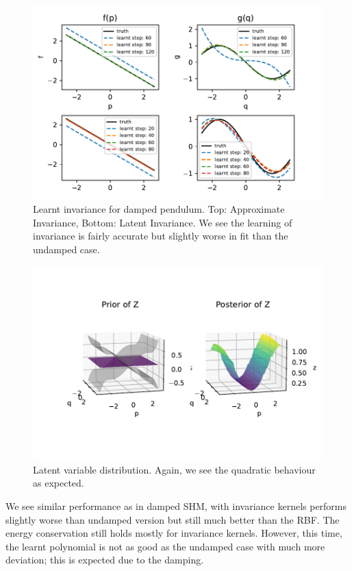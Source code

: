 \documentclass{statsmsc}
\begin{document}
\begin{figure}[H] 
  \includegraphics[width=0.8\linewidth]{../codes/figures/damped_pendulum_learnt_over_time.pdf}
  \centering
  \caption{Learnt invariance for damped pendulum. Top: Approximate Invariance, Bottom: Latent Invariance. We see the learning of invariance is fairly accurate but slightly worse in fit than the undamped case.}
  \label{fig:damped_pendulum_learnt}
\end{figure}

\begin{figure}[H] 
  \includegraphics[width=0.8\linewidth]{../codes/figures/latent_damped_pendulum.pdf}
  \centering
  \caption{Latent variable distribution. Again, we see the quadratic behaviour as expected.}
  \label{fig:latent_damped_pendulum}
\end{figure}

We see similar performance as in damped SHM, with invariance kernels performs slightly worse than undamped version but still much better than the RBF.
The energy conservation still holds mostly for invariance kernels.
However, this time, the learnt polynomial is not as good as the undamped case with much more deviation; this is expected due to the damping.
\end{document}
